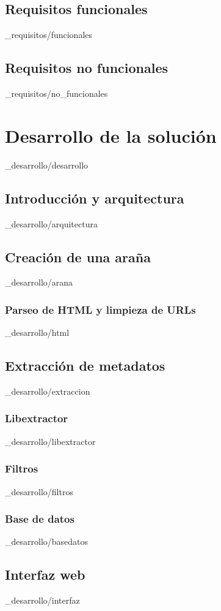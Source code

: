 \documentclass[epsbased,copyright,final,printable,covers,extendedindex,firstnumbered,tfg,gnuplot]{tfgtfmthesisuam}
\begin{document}
  \section{Requisitos funcionales\label{SEC:ESTRUCTURAR}}{_requisitos/funcionales}
  \section{Requisitos no funcionales\label{SEC:ESTRUCTURAR}}{_requisitos/no_funcionales}

\chapter{Desarrollo de la soluci\'on\label{CAP:ELEMINT}}{_desarrollo/desarrollo}
  \section{Introducci\'on y arquitectura\label{SEC:CUADROS}}{_desarrollo/arquitectura}
  \section{Creaci\'on de una ara\~na\label{SEC:CUADROS}}{_desarrollo/arana}
    \subsection{Parseo de HTML y limpieza de URLs\label{SS:PRESUPUESTOS}}{_desarrollo/html}
  \section{Extracci\'on de metadatos\label{SEC:FIGURAS}}{_desarrollo/extraccion}
    \subsection{Libextractor\label{SS:PRESUPUESTOS}}{_desarrollo/libextractor}
    \subsection{Filtros\label{SS:PRESUPUESTOS}}{_desarrollo/filtros}
    \subsection{Base de datos\label{SS:PRESUPUESTOS}}{_desarrollo/basedatos}
  \section{Interfaz web\label{SEC:CUADROS}}{_desarrollo/interfaz}
\end{document}
